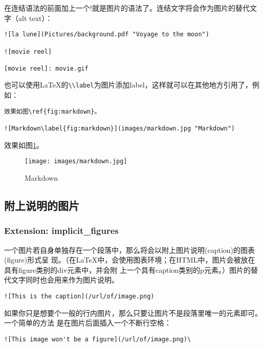\documentclass[fancyhdr,bookmark]{ctexbook}
\newcommand{\passthrough}[1]{#1}
\begin{document}
在连结语法的前面加上一个!就是图片的语法了。连结文字将会作为图片的替代文字（alt
text）：

\begin{lstlisting}
![la lune](Pictures/background.pdf "Voyage to the moon")

![movie reel]

[movie reel]: movie.gif
\end{lstlisting}

也可以使用LaTeX的\passthrough{\lstinline!\\label!}为图片添加label，这样就可以在其他地方引用了，例如：

\begin{lstlisting}
效果如图\ref{fig:markdown}。

![Markdown\label{fig:markdown}](images/markdown.jpg "Markdown")
\end{lstlisting}

效果如图\ref{fig:markdown}。

\begin{figure}
\centering
\texttt{[image: images/markdown.jpg]}
\caption{Markdown\label{fig:markdown}}
\end{figure}

\hypertarget{ux9644ux4e0aux8bf4ux660eux7684ux56feux7247}{%
\subsection{附上说明的图片}\label{ux9644ux4e0aux8bf4ux660eux7684ux56feux7247}}

\hypertarget{extension-implicit_figures}{%
\subsubsection{Extension:
implicit\_figures}\label{extension-implicit_figures}}

一个图片若自身单独存在一个段落中，那么将会以附上图片说明(caption)的图表(figure)形式呈
现。（在LaTeX中，会使用图表环境；在HTML中，图片会被放在具有figure类别的div元素中，并会附
上一个具有caption类别的p元素。）图片的替代文字同时也会用来作为图片说明。

\begin{lstlisting}
![This is the caption](/url/of/image.png)
\end{lstlisting}

如果你只是想要个一般的行内图片，那么只要让图片不是段落里唯一的元素即可。一个简单的方法
是在图片后面插入一个不断行空格：

\begin{lstlisting}
![This image won't be a figure](/url/of/image.png)\
\end{lstlisting}
\end{document}
